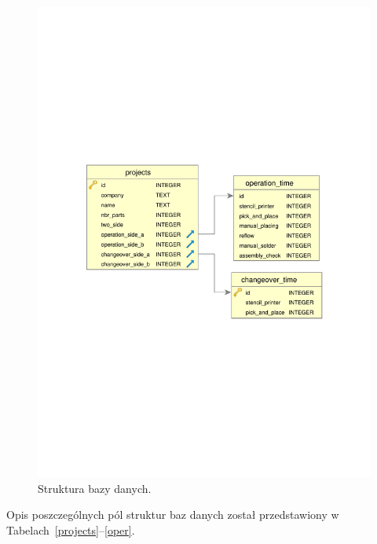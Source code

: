 \begin{figure}[H]
	\centering
	\includegraphics[scale=0.9]{chapters/chapter4/db_crop.pdf}
	\caption{Struktura bazy danych.}
	\label{baza_danych}
\end{figure}


Opis poszczególnych pól struktur baz danych został przedstawiony w Tabelach~\ref{projects}--\ref{oper}.

